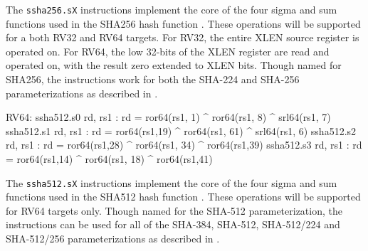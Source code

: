 The {\tt ssha256.sX}
instructions implement the core of the four sigma and sum functions used in
the SHA256 hash function \cite[Section 4.1.2]{nist:fips:180:4}.
These operations will be supported for a both RV32 and RV64 targets.
For RV32, the entire XLEN source register is operated on.
For RV64, the low 32-bits of the XLEN register are read and operated on,
with the result zero extended to XLEN bits.
Though named for SHA256, the instructions work for both the
SHA-224 and SHA-256 parameterizations as described in
\cite{nist:fips:180:4}.


\begin{isa}
RV64:
    ssha512.s0 rd, rs1 : rd = ror64(rs1, 1) ^ ror64(rs1,  8) ^ srl64(rs1, 7)
    ssha512.s1 rd, rs1 : rd = ror64(rs1,19) ^ ror64(rs1, 61) ^ srl64(rs1, 6)
    ssha512.s2 rd, rs1 : rd = ror64(rs1,28) ^ ror64(rs1, 34) ^ ror64(rs1,39)
    ssha512.s3 rd, rs1 : rd = ror64(rs1,14) ^ ror64(rs1, 18) ^ ror64(rs1,41)
\end{isa}

The {\tt ssha512.sX}
instructions implement the core of the four sigma and sum functions used in
the SHA512 hash function \cite[Section 4.1.3]{nist:fips:180:4}.
These operations will be supported for RV64 targets only.
Though named for the SHA-512 parameterization, the instructions
can be used for all of the SHA-384, SHA-512, SHA-512/224 and SHA-512/256
parameterizations as described in \cite{nist:fips:180:4}.



